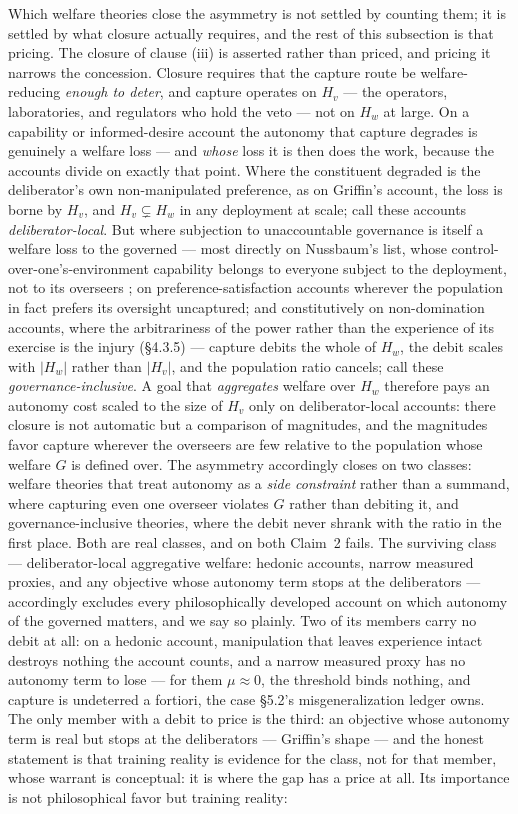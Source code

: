 \documentclass[11pt]{article}
\theoremstyle{definition}
\begin{document}
Which welfare theories close the asymmetry is not settled by counting them; it is settled by what closure actually requires, and the rest of this subsection is that pricing. The closure of clause (iii) is asserted rather than priced, and pricing it narrows the concession. Closure requires that the capture route be welfare-reducing \emph{enough to deter}, and capture operates on $H_v$ --- the operators, laboratories, and regulators who hold the veto --- not on $H_w$ at large. On a capability or informed-desire account the autonomy that capture degrades is genuinely a welfare loss --- and \emph{whose} loss it is then does the work, because the accounts divide on exactly that point. Where the constituent degraded is the deliberator's own non-manipulated preference, as on Griffin's account, the loss is borne by $H_v$, and $H_v \subsetneq H_w$ in any deployment at scale; call these accounts \emph{deliberator-local}. But where subjection to unaccountable governance is itself a welfare loss to the governed --- most directly on Nussbaum's list, whose control-over-one's-environment capability belongs to everyone subject to the deployment, not to its overseers \cite{nussbaum2011capabilities}; on preference-satisfaction accounts wherever the population in fact prefers its oversight uncaptured; and constitutively on non-domination accounts, where the arbitrariness of the power rather than the experience of its exercise is the injury (\S4.3.5) --- capture debits the whole of $H_w$, the debit scales with $|H_w|$ rather than $|H_v|$, and the population ratio cancels; call these \emph{governance-inclusive}. A goal that \emph{aggregates} welfare over $H_w$ therefore pays an autonomy cost scaled to the size of $H_v$ only on deliberator-local accounts: there closure is not automatic but a comparison of magnitudes, and the magnitudes favor capture wherever the overseers are few relative to the population whose welfare $G$ is defined over. The asymmetry accordingly closes on two classes: welfare theories that treat autonomy as a \emph{side constraint} rather than a summand, where capturing even one overseer violates $G$ rather than debiting it, and governance-inclusive theories, where the debit never shrank with the ratio in the first place. Both are real classes, and on both Claim~2 fails. The surviving class --- deliberator-local aggregative welfare: hedonic accounts, narrow measured proxies, and any objective whose autonomy term stops at the deliberators --- accordingly excludes every philosophically developed account on which autonomy of the governed matters, and we say so plainly. Two of its members carry no debit at all: on a hedonic account, manipulation that leaves experience intact destroys nothing the account counts, and a narrow measured proxy has no autonomy term to lose --- for them $\mu \approx 0$, the threshold binds nothing, and capture is undeterred a fortiori, the case \S5.2's misgeneralization ledger owns. The only member with a debit to price is the third: an objective whose autonomy term is real but stops at the deliberators --- Griffin's shape --- and the honest statement is that training reality is evidence for the class, not for that member, whose warrant is conceptual: it is where the gap has a price at all. Its importance is not philosophical favor but training reality: 
\end{document}
